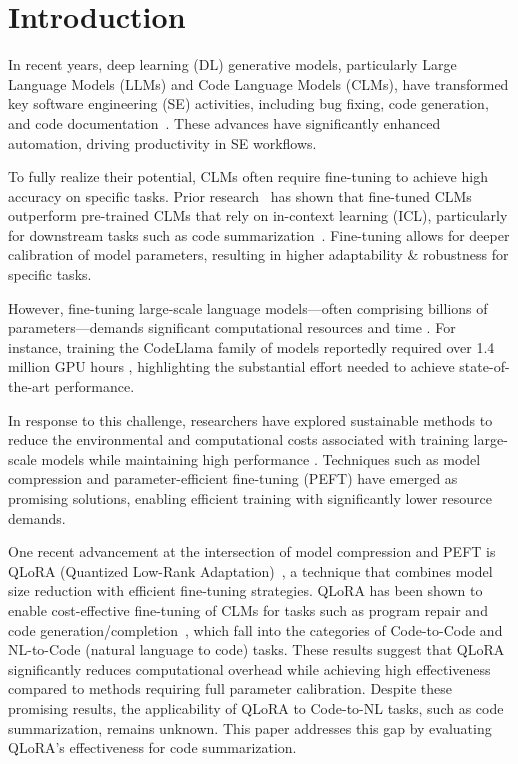 \section{Introduction}
\label{sec:intro}

In recent years, deep learning (DL) generative models, particularly Large Language Models (LLMs) and  Code Language Models (CLMs), have transformed key software engineering (SE) activities, including bug fixing, code generation, and code documentation~\cite{charalambous2023new,mastropaolo2021studying,mastropaolo2024evaluating,tian2023chatgpt,zhang2020retrieval}.
These advances have significantly enhanced automation, driving productivity in SE workflows.

To fully realize their potential, CLMs often require fine-tuning to achieve high accuracy on specific tasks.
Prior research~\cite{weyssow2023exploring,liu2022few} has shown that fine-tuned CLMs outperform pre-trained CLMs that rely on in-context learning (ICL), particularly for downstream tasks such as code summarization~\cite{ahmed2024automatic,ahmed2022few,wang2022no}.
Fine-tuning allows for deeper calibration of model parameters, resulting in higher adaptability \& robustness for specific tasks.

However, fine-tuning large-scale language models—often comprising billions of parameters—demands significant computational resources and time \cite{hou2023large}. For instance, training the CodeLlama \cite{codellama} family of models reportedly required over 1.4 million GPU hours \cite{codellama2}, highlighting the substantial effort needed to achieve state-of-the-art performance.


In response to this challenge, researchers have explored sustainable methods to reduce the environmental and computational costs associated with training large-scale models while maintaining high performance \cite{wei2023towards, weyssow2023exploring, ayupov2022parameter, lu2023llama}. Techniques such as model compression and parameter-efficient fine-tuning (PEFT) \cite{ayupov2022parameter, lu2023llama, weyssow2023exploring, su2024distilled, shi2023towards} have emerged as promising solutions, enabling efficient training with significantly lower resource demands.

One recent advancement at the intersection of model compression and PEFT is QLoRA (Quantized Low-Rank Adaptation)~\cite{dettmers2024qlora}, a technique that combines model size reduction with efficient fine-tuning strategies. QLoRA has been shown to enable cost-effective fine-tuning of CLMs for tasks such as program repair and code generation/completion~\cite{weyssow2023exploring, yang2024multi}, which fall into the categories of Code-to-Code and NL-to-Code (natural language to code) tasks. These results suggest that QLoRA significantly reduces computational overhead while achieving high effectiveness compared to methods requiring full parameter calibration. Despite these promising results, the applicability of QLoRA to Code-to-NL tasks, such as code summarization, remains unknown. This paper addresses this gap by evaluating QLoRA's effectiveness for code summarization.

